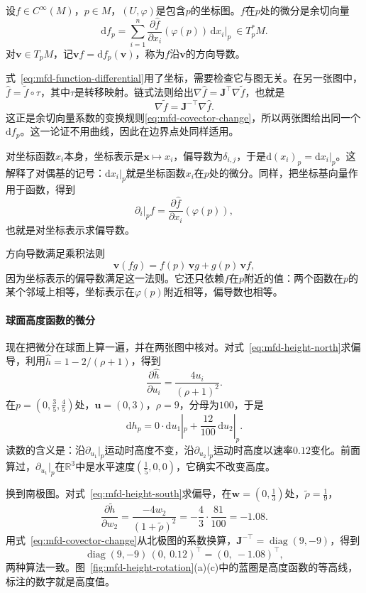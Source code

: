 \begin{definition}[函数的微分]
\label{def:mfd-function-differential}
设$f\in C^\infty(M)$，$p\in M$，$(U,\varphi)$是包含$p$的坐标图。$f$在$p$处的微分是余切向量
\begin{equation}
\mathrm df_p=\sum_{i=1}^n\frac{\partial\hat f}{\partial x_i}(\varphi(p))\,\mathrm dx_i|_p\ \in T_p^*M .
\label{eq:mfd-function-differential}
\end{equation}
对$\bm v\in T_pM$，记$\bm v f=\mathrm df_p(\bm v)$，称为$f$沿$\bm v$的方向导数。
\end{definition}

式~\eqref{eq:mfd-function-differential}用了坐标，需要检查它与图无关。在另一张图中，$\hat f=\tilde f\circ\tau$，其中$\tau$是转移映射。链式法则给出$\nabla\hat f=\bm J^\top\nabla\tilde f$，也就是
\[
\nabla\tilde f=\bm J^{-\top}\nabla\hat f .
\]
这正是余切向量系数的变换规则\eqref{eq:mfd-covector-change}，所以两张图给出同一个$\mathrm df_p$。这一论证不用曲线，因此在边界点处同样适用。

对坐标函数$x_i$本身，坐标表示是$\bm x\mapsto x_i$，偏导数为$\delta_{i,j}$，于是$\mathrm d(x_i)_p=\mathrm dx_i|_p$。这解释了对偶基的记号：$\mathrm dx_i|_p$就是坐标函数$x_i$在$p$处的微分。同样，把坐标基向量作用于函数，得到
\[
\partial_i|_pf=\frac{\partial\hat f}{\partial x_i}(\varphi(p)),
\]
也就是对坐标表示求偏导数。

方向导数满足乘积法则
\[
\bm v(fg)=f(p)\,\bm vg+g(p)\,\bm vf,
\]
因为坐标表示的偏导数满足这一法则。它还只依赖$f$在$p$附近的值：两个函数在$p$的某个邻域上相等，坐标表示在$\varphi(p)$附近相等，偏导数也相等。

\paragraph{球面高度函数的微分}
现在把微分在球面上算一遍，并在两张图中核对。对式~\eqref{eq:mfd-height-north}求偏导，利用$\hat h=1-2/(\rho+1)$，得到
\[
\frac{\partial\hat h}{\partial u_i}=\frac{4u_i}{(\rho+1)^2}.
\]
在$p=(0,\tfrac35,\tfrac45)$处，$\bm u=(0,3)$，$\rho=9$，分母为$100$，于是
\[
\mathrm dh_p=0\cdot\mathrm du_1|_p+\frac{12}{100}\,\mathrm du_2|_p .
\]
读数的含义是：沿$\partial_{u_1}|_p$运动时高度不变，沿$\partial_{u_2}|_p$运动时高度以速率$0.12$变化。前面算过，$\partial_{u_1}|_p$在$\mathbb R^3$中是水平速度$(\tfrac15,0,0)$，它确实不改变高度。

换到南极图。对式~\eqref{eq:mfd-height-south}求偏导，在$\bm w=(0,\tfrac13)$处，$\tilde\rho=\tfrac19$，
\[
\frac{\partial\tilde h}{\partial w_2}=\frac{-4w_2}{(1+\tilde\rho)^2}=-\frac{4}{3}\cdot\frac{81}{100}=-1.08 .
\]
用式~\eqref{eq:mfd-covector-change}从北极图的系数换算，$\bm J^{-\top}=\operatorname{diag}(9,-9)$，得到
\[
\operatorname{diag}(9,-9)\,(0,\ 0.12)^\top=(0,\ -1.08)^\top ,
\]
两种算法一致。图~\ref{fig:mfd-height-rotation}(a)(c)中的蓝圈是高度函数的等高线，标注的数字就是高度值。

